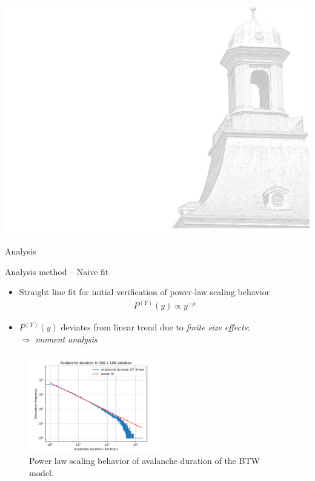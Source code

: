 \documentclass[xcolor=dvipsnames]{beamer}
\begin{document}
    
    {\usebackgroundtemplate%
        {%
            \includegraphics[width=\paperwidth,height=\paperheight]{bkg1.pdf}%
        }
        \begin{frame}
            \centering \Huge \color{ublue} Analysis
            \thispagestyle{empty}
            \addtocounter{framenumber}{-1}
        \end{frame}
    }
    
    \begin{frame}{Analysis method -- Naive fit}
        \begin{itemize}
            \item {Straight line fit for initial verification of power-law scaling behavior
                \begin{align*}
                P^{(Y)}(y) \propto y^{-\rho}
                \end{align*}
                }
            \item {$P^{(Y)}(y)$ deviates from linear trend due to \textit{finite size effects}:\\
                   $\Rightarrow$ \textit{moment analysis}}
        \end{itemize}
        \begin{figure}[h]
            \captionsetup{width=\textwidth}
            \centering
            \includegraphics[width=0.51\textwidth]{naive_fit.pdf}
            \caption{Power law scaling behavior of avalanche duration of the BTW model.}
        \end{figure}
    \end{frame}
    
\end{document}
